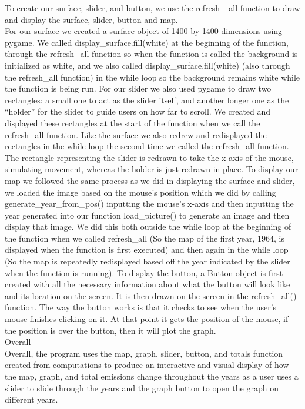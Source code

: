 \documentclass[fontsize=11pt]{article}
\begin{document}
To create our surface, slider, and button, we use the refresh\_ all function to draw and display the surface, slider, button and map. \\
For our surface we created a surface object of 1400 by 1400 dimensions using pygame. We called display\_surface.fill(white) at the beginning of the function, through the refresh\_all function so when the function is called the background is initialized as white, and we also called display\_surface.fill(white) (also through the refresh\_all function) in the while loop so the background remains white while the function is being run. 
For our slider we also used pygame to draw two rectangles: a small one to act as the slider itself, and another longer one as the “holder” for the slider to guide users on how far to scroll. We created and displayed these rectangles at the start of the function when we call the refresh\_all function. Like the surface we also redrew and redisplayed the rectangles in the while loop the second time we called the refresh\_all function. The rectangle representing the slider is redrawn to take the x-axis of the mouse, simulating movement, whereas the holder is just redrawn in place. 
To display our map we followed the same process as we did in displaying the surface and slider, we loaded the image based on the mouse's position which we did by calling generate\_year\_from\_pos() inputting the mouse’s x-axis and then inputting the year generated into our function load\_picture() to generate an image and then display that image. We did this both outside the while loop at the beginning of the function when we called refresh\_all (So the map of the first year, 1964, is displayed when the function is first executed) and then again in the while loop (So the map is repeatedly redisplayed based off the year indicated by the slider when the function is running). 
To display the button, a Button object is first created with all the necessary information about what the button will look like and its location on the screen. It is then drawn on the screen in the refresh\_all() function. The way the button works is that it checks to see when the user’s mouse finishes clicking on it. At that point it gets the position of the mouse, if the position is over the button, then it will plot the graph. \\

\underline{Overall} \\

Overall, the program uses the map, graph, slider, button, and totals function created from computations to produce an interactive and visual display of how the map, graph, and total emissions change throughout the years as a user uses a slider to slide through the years and the graph button to open the graph on different years. 
\end{document}
